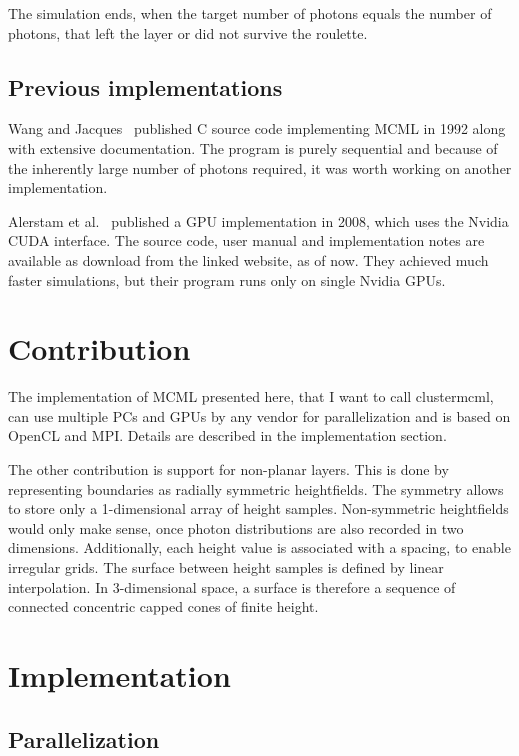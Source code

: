 \documentclass[]{article}
\begin{document}
The simulation ends, when the target number of photons equals the number of photons, that left the layer or did not survive the roulette.

\subsection{Previous implementations}

Wang and Jacques~\cite{wang1992monte} published C source code implementing MCML in 1992 along with extensive documentation. The program is purely sequential and because of the inherently large number of photons required, it was worth working on another implementation.

Alerstam et al.~\cite{alerstam2008parallel} published a GPU implementation in 2008, which uses the Nvidia CUDA interface. The source code, user manual and implementation notes are available as download from the linked website, as of now. They achieved much faster simulations, but their program runs only on single Nvidia GPUs.

\section{Contribution}

The implementation of MCML presented here, that I want to call clustermcml, can use multiple PCs and GPUs by any vendor for parallelization and is based on OpenCL and MPI. Details are described in the implementation section.

The other contribution is support for non-planar layers. This is done by representing boundaries as radially symmetric heightfields. The symmetry allows to store only a 1-dimensional array of height samples. Non-symmetric heightfields would only make sense, once photon distributions are also recorded in two dimensions. Additionally, each height value is associated with a spacing, to enable irregular grids. The surface between height samples is defined by linear interpolation. In 3-dimensional space, a surface is therefore a sequence of connected concentric capped cones of finite height.

\section{Implementation}

\subsection{Parallelization}
\end{document}
